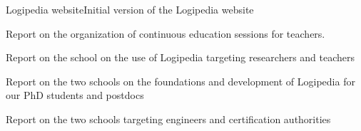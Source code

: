 \begin{workpackage}[id=dissemination,type=MGT,
  short={Dissemination, communication and exploitation},
  title={Dissemination, communication and exploitation},
  lead=Inr]
\begin{tasklist}
\end{tasklist}

\begin{wpdelivs}


  \begin{wpdeliv}[due=1,miles=startup,id=requirements,dissem=PU,nature=DEC,lead=Inr]{Logipedia website}Initial version of the Logipedia website
  \end{wpdeliv}


  \begin{wpdeliv}[due=18,miles=???,id=continuoused,dissem=PU,nature=R,lead=Str]{
 Report on the organization of continuous education sessions for teachers.}
  \end{wpdeliv}

  \begin{wpdeliv}[due=48,miles=???,id=school-researchers,dissem=PU,nature=R,lead=Bir]{Report on the school on the use of Logipedia targeting researchers and teachers}
  \end{wpdeliv}


  \begin{wpdeliv}[due=24,miles=???,id=school-second-phd,dissem=PU,nature=R,lead=Bir]{Report on the two schools on the foundations and development of Logipedia for our PhD students and postdocs}
  \end{wpdeliv}


  \begin{wpdeliv}[due=24,miles=???,id=school-second-certif,dissem=PU,nature=R,lead=Irt]{Report on the two schools targeting engineers and certification authorities}
  \end{wpdeliv}



\end{wpdelivs}
\end{workpackage}
